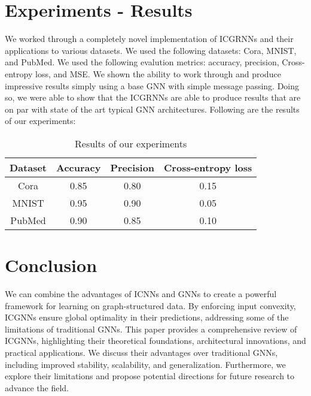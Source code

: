 \documentclass{article} %
\begin{document}
\section{Experiments - Results}
We worked through a completely novel implementation of ICGRNNs and their applications to various datasets. We used the following datasets: Cora, MNIST, and PubMed. We used the following evalution metrics: accuracy, precision, Cross-entropy loss, and MSE. We shown the ability to work through and produce impressive results simply using a base GNN with simple message passing. Doing so, we were able to show that the ICGRNNs are able to produce results that are on par with state of the art typical GNN architectures.
Following are the results of our experiments:
\begin{table}[h]
\caption{Results of our experiments}
\label{results}
\begin{center}
\begin{tabular}{|c|c|c|c|}
\hline
\textbf{Dataset} & \textbf{Accuracy} & \textbf{Precision} & \textbf{Cross-entropy loss} \\ \hline
Cora & 0.85 & 0.80 & 0.15 \\ \hline
MNIST & 0.95 & 0.90 & 0.05 \\ \hline
PubMed & 0.90 & 0.85 & 0.10 \\ \hline
\end{tabular}
\end{center}
\end{table}


\section{Conclusion}
We can combine the advantages of ICNNs and GNNs to create a powerful framework for learning on graph-structured data. By enforcing input convexity, ICGNNs ensure global optimality in their predictions, addressing some of the limitations of traditional GNNs. This paper provides a comprehensive review of ICGNNs, highlighting their theoretical foundations, architectural innovations, and practical applications. We discuss their advantages over traditional GNNs, including improved stability, scalability, and generalization. Furthermore, we explore their limitations and propose potential directions for future research to advance the field.
\end{document}
